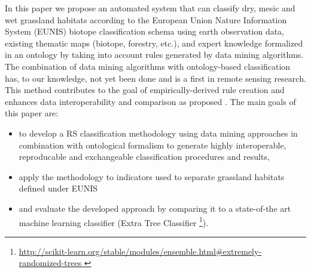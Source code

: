 \documentclass[authoryear, review,12pt,number]{elsarticle}
\begin{document}
In this paper we propose an automated system that can classify dry, mesic and
wet grassland habitats according to the European Union Nature Information System
(EUNIS) biotope classification schema using earth observation data, existing
thematic maps (biotope, forestry, etc.), and expert knowledge formalized in an
ontology by taking into account rules generated by data mining algorithms. The
combination of data mining algorithms with ontology-based classification has, to
our knowledge, not yet been done and is a first in remote sensing research.
This method contributes to the goal of empirically-derived rule creation and
enhances data interoperability and comparison as proposed \cite{Janowicz2012}.
The main goals of this paper are:
\begin{itemize}
 \item to develop a RS classification methodology using data mining approaches
     in combination with ontological formalism to generate highly interoperable,
     reproducable and exchangeable classification procedures and results,
 \item apply the methodology to indicators used to separate grassland habitats
     defined under EUNIS
 \item and evaluate the developed approach by comparing it to a state-of-the art
     machine learning classifier (Extra Tree 
Classifier 
\footnote{\url{
http://scikit-learn.org/stable/modules/ensemble.html#extremely-randomized-trees
}}).
\end{itemize}
\end{document}
